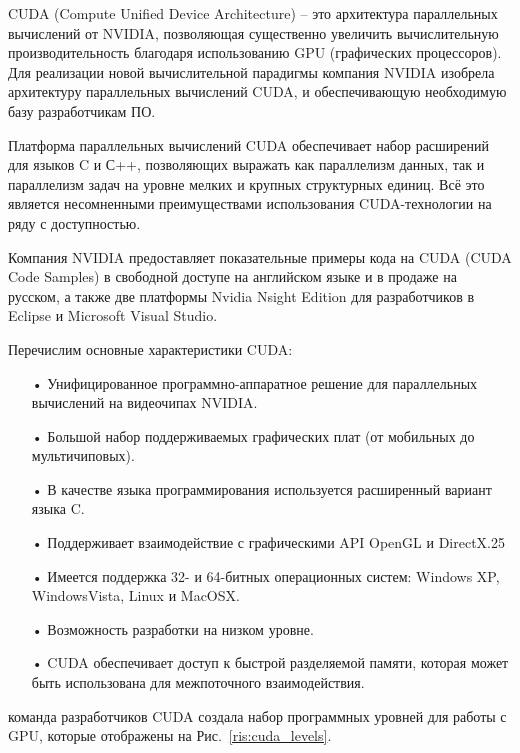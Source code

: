 \documentclass[a4paper,14pt,russian]{extreport}
\begin{document}
\cite{cuda_best} \cite{sanders} \cite{kirk} \cite{boreskov}
\par
CUDA (Compute Unified Device Architecture) – это архитектура параллельных вычислений от NVIDIA, позволяющая существенно увеличить вычислительную производительность благодаря использованию GPU (графических процессоров). Для реализации новой вычислительной парадигмы компания NVIDIA изобрела архитектуру параллельных вычислений CUDA, и обеспечивающую необходимую базу разработчикам ПО.
\par
Платформа параллельных вычислений CUDA обеспечивает набор расширений для языков C и С++, позволяющих выражать как параллелизм данных, так и параллелизм задач на уровне мелких и крупных структурных единиц. Всё это является несомненными преимуществами использования CUDA-технологии на ряду с доступностью.
\par
Компания NVIDIA предоставляет показательные примеры кода на CUDA (CUDA Code Samples) в свободной доступе на английском языке и в продаже на русском, а также две платформы Nvidia Nsight Edition для разработчиков в Eclipse и Microsoft Visual Studio. 
\par Перечислим основные характеристики CUDA:
\begin{itemize}
\item[•] Унифицированное программно-аппаратное решение для параллельных вычислений на видеочипах NVIDIA.
\item[•] Большой набор поддерживаемых графических плат (от мобильных до мультичиповых).
\item[•] В качестве языка программирования используется расширенный вариант языка C.
\item[•] Поддерживает взаимодействие с графическими API OpenGL и DirectX.25
\item[•] Имеется поддержка 32- и 64-битных операционных систем: Windows XP, WindowsVista, Linux и MacOSX.
\item[•] Возможность разработки на низком уровне.
\item[•] CUDA обеспечивает доступ к быстрой разделяемой памяти, которая может быть использована для межпоточного взаимодействия.
\end{itemize}
\par
команда разработчиков CUDA  создала набор программных уровней для работы с GPU, которые отображены на Рис.~\ref{ris:cuda_levels}.
\par
\end{document}
